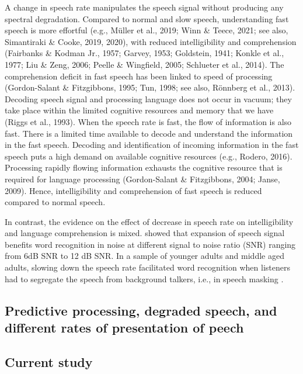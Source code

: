 \documentclass[a4paper, nobind]{templates/ociamthesis}
\begin{document}
A change in speech rate manipulates the speech signal without producing any spectral degradation.
Compared to normal and slow speech, understanding fast speech is more effortful (e.g., Müller et al., 2019; Winn \& Teece, 2021; see also, Simantiraki \& Cooke, 2019, 2020), with reduced intelligibility and comprehension (Fairbanks \& Kodman Jr., 1957; Garvey, 1953; Goldstein, 1941; Konkle et al., 1977; Liu \& Zeng, 2006; Peelle \& Wingfield, 2005; Schlueter et al., 2014).
The comprehension deficit in fast speech has been linked to speed of processing (Gordon-Salant \& Fitzgibbons, 1995; Tun, 1998; see also, Rönnberg et al., 2013).
Decoding speech signal and processing language does not occur in vacuum; they take place within the limited cognitive resources and memory that we have (Riggs et al., 1993).
When the speech rate is fast, the flow of information is also fast. There is a limited time available to decode and understand the information in the fast speech.
Decoding and identification of incoming information in the fast speech puts a high demand on available cognitive resources (e.g., Rodero, 2016).
Processing rapidly flowing information exhausts the cognitive resource that is required for language processing (Gordon-Salant \& Fitzgibbons, 2004; Janse, 2009).
Hence, intelligibility and comprehension of fast speech is reduced compared to normal speech.

In contrast, the evidence on the effect of decrease in speech rate on intelligibility and language comprehension is mixed.
\textcite{Shobha2009} showed that expansion of speech signal benefits word recognition in noise at different signal to noise ratio (SNR) ranging from 6dB SNR to 12 dB SNR.
In a sample of younger adults and middle aged adults, slowing down the speech rate facilitated word recognition when listeners had to segregate the speech from background talkers, i.e., in speech masking \autocite{Brungart2007}.

\hypertarget{predictive-processing-degraded-speech-and-different-rates-of-presentation-of-peech}{%
\subsection{Predictive processing, degraded speech, and different rates of presentation of peech}\label{predictive-processing-degraded-speech-and-different-rates-of-presentation-of-peech}}

\hypertarget{current-study}{%
\subsection{Current study}\label{current-study}}
\end{document}
